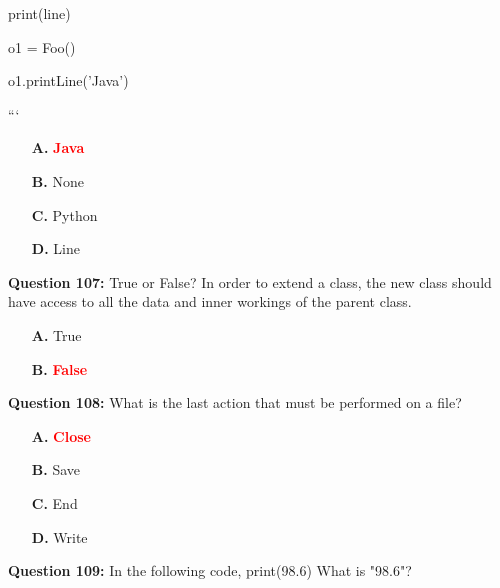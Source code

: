 \documentclass[12pt,a4paper]{article}
\begin{document}
\newline
        print(line)\newline

\newline
\newline

\newline
o1 = Foo()\newline

\newline
o1.printLine('Java')\newline

\newline
```

\begin{itemize}
    \item[\textbf{A.}] \textcolor{red}{\textbf{Java}}
    \item[\textbf{B.}] None
    \item[\textbf{C.}] Python
    \item[\textbf{D.}] Line
\end{itemize}

\vspace{0.5cm}

\textbf{Question 107:} True or False? In order to extend a class, the new class should have access to all the data and inner workings of the parent class.

\begin{itemize}
    \item[\textbf{A.}] True
    \item[\textbf{B.}] \textcolor{red}{\textbf{False}}
\end{itemize}

\vspace{0.5cm}

\textbf{Question 108:} What is the last action that must be performed on a file?

\begin{itemize}
    \item[\textbf{A.}] \textcolor{red}{\textbf{Close}}
    \item[\textbf{B.}] Save
    \item[\textbf{C.}] End
    \item[\textbf{D.}] Write
\end{itemize}

\vspace{0.5cm}

\textbf{Question 109:} In the following code, print(98.6) What is "98.6"?
\end{document}
